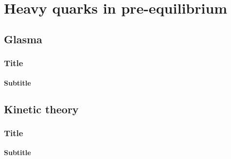\documentclass[aspectratio=169,11pt,usenames,dvipsnames]{beamer}
\begin{document}



\section{{\color{jyublue}Heavy quarks} in pre-equilibrium}

\subsection{Glasma}

\begin{frame}
    \frametitle{Title}
    \framesubtitle{Subtitle}
\end{frame}

\subsection{Kinetic theory}

\begin{frame}
    \frametitle{Title}
    \framesubtitle{Subtitle}
\end{frame}

\end{document}
